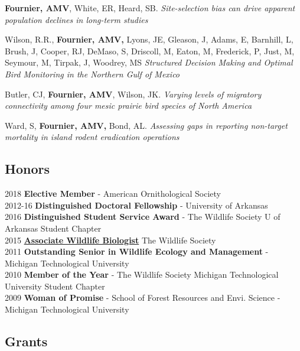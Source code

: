 \documentclass[]{article}
\begin{document}
\textbf{Fournier, AMV}, White, ER, Heard, SB. \emph{Site-selection bias
can drive apparent population declines in long-term studies}

Wilson, R.R., \textbf{Fournier, AMV,} Lyons, JE, Gleason, J, Adams, E,
Barnhill, L, Brush, J, Cooper, RJ, DeMaso, S, Driscoll, M, Eaton, M,
Frederick, P, Just, M, Seymour, M, Tirpak, J, Woodrey, MS
\emph{Structured Decision Making and Optimal Bird Monitoring in the
Northern Gulf of Mexico}

Butler, CJ, \textbf{Fournier, AMV}, Wilson, JK. \emph{Varying levels of
migratory connectivity among four mesic prairie bird species of North
America}

Ward, S, \textbf{Fournier, AMV,} Bond, AL. \emph{Assessing gaps in
reporting non-target mortality in island rodent eradication operations}

\subsection{Honors}\label{honors}

2018 \textbf{Elective Member} - American Ornithological Society\\
2012-16 \textbf{Distinguished Doctoral Fellowship} - University of
Arkansas\\
2016 \textbf{Distinguished Student Service Award} - The Wildlife Society
U of Arkansas Student Chapter\\
2015
\href{http://wildlife.org/learn/professional-development-certification/certification-programs/}{\textbf{Associate
Wildlife Biologist}} The Wildlife Society\\
2011 \textbf{Outstanding Senior in Wildlife Ecology and Management} -
Michigan Technological University\\
2010 \textbf{Member of the Year} - The Wildlife Society Michigan
Technological University Student Chapter\\
2009 \textbf{Woman of Promise} - School of Forest Resources and Envi.
Science - Michigan Technological University

\subsection{Grants}\label{grants}
\end{document}
